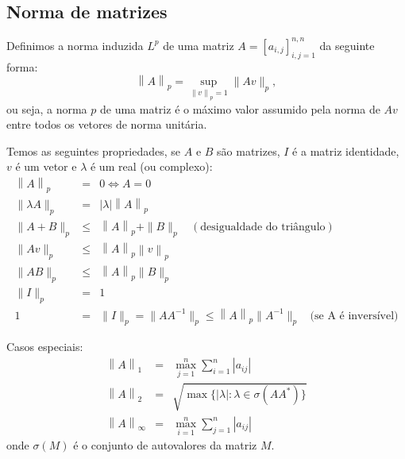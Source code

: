 \subsection{Norma de matrizes}

Definimos a norma induzida $L^p$ de uma matriz $A = [a_{i,j}]_{i,j=1}^{n,n}$ da seguinte forma:
\begin{equation*}
  \left\|A\right\|_p = \sup_{\left\|v\right\|_p=1} \|Av\|_p,
\end{equation*}
ou seja, a norma $p$ de uma matriz é o máximo valor assumido pela norma de $Av$ entre todos os vetores de norma unitária.

Temos as seguintes propriedades, se $A$ e $B$ são matrizes, $I$ é a matriz identidade, $v$ é um vetor e $\lambda$ é um real (ou complexo):
\begin{eqnarray*}
\left\|A\right\|_p&=&0 \Longleftrightarrow A=0\\
\|\lambda A\|_p&=&|\lambda| \left\|A\right\|_p\\
\|A+B\|_p &\leq & \left\|A\right\|_p + \|B\|_p~~~~ (\text{desigualdade do triângulo})\\
\|Av\|_p &\leq& \left\|A\right\|_p\left\|v\right\|_p\\
\|AB\|_p &\leq& \left\|A\right\|_p\|B\|_p\\
\|I\|_p&=&1\\
1&=&\|I\|_p=\|AA^{-1}\|_p\leq \left\|A\right\|_p\|A^{-1}\|_p~~~~ \text{(se A é inversível)}
\end{eqnarray*}

Casos especiais:
\begin{eqnarray*}
\left\|A\right\|_1&=& \max_{j=1}^n\sum_{i=1}^n \left|a_{ij}\right|\\
\left\|A\right\|_2&=& \sqrt{\max\{|\lambda|: \lambda \in \sigma(AA^*)\}}\\
\left\|A\right\|_\infty&=& \max_{i=1}^n\sum_{j=1}^n \left|a_{ij}\right|
\end{eqnarray*}
onde $\sigma(M)$ é o conjunto de autovalores da matriz $M$.

